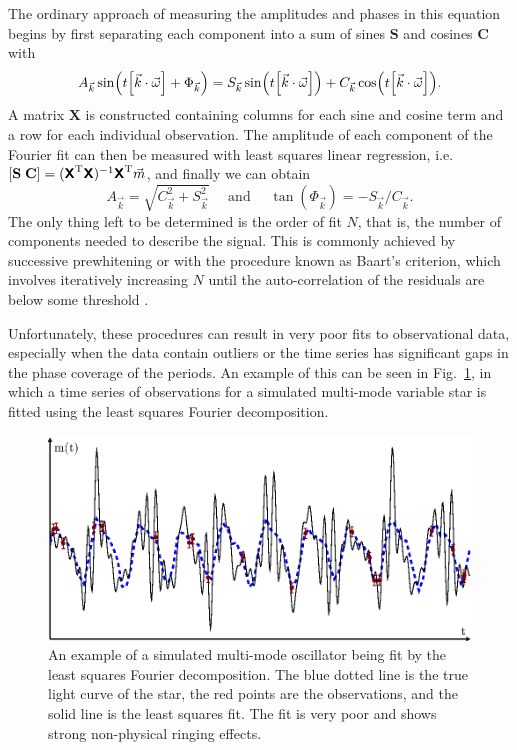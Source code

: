 \documentclass[11pt,twoside]{book}
\begin{document}
The ordinary approach of measuring the amplitudes and phases in this equation begins by first separating each component into a sum of sines $\mathbf S$ and cosines $\mathbf C$ with
\begin{equation} \label{eq:varsep}
    A_{\vec k} \sin(t\qty[\vec k\cdot \vec \omega] + \Phi_{\vec k}) = S_{\vec k} \sin(t\qty[\vec k\cdot \vec \omega]) + C_{\vec k} \cos(t\qty[\vec k\cdot \vec \omega]).
\end{equation}
A matrix $\mathbf{X}$ is constructed containing columns for each sine and cosine term and a row for each individual observation. The amplitude of each component of the Fourier fit can then be measured with least squares linear regression, i.e.~ $\qty[\mathbf{S}\; \mathbf{C}] = (\textsf{\textbf{X}}^\text{T} \textsf{\textbf{X}})^{-1} \textsf{\textbf{X}}^\text{T} \vec{m}$, and finally we can obtain
\begin{equation}
    A_{\vec{k}} = \sqrt{C_{\vec{k}}^2 + S_{\vec{k}}^2} \quad \text{ and } \quad \tan(\Phi_{\vec{k}}) = -S_{\vec{k}} / C_{\vec{k}}.
\end{equation}
The only thing left to be determined is the order of fit $N$, that is, the number of components needed to describe the signal. This is commonly achieved by successive prewhitening or with the procedure known as Baart's criterion, which involves iteratively increasing $N$ until the auto-correlation of the residuals are below some threshold \citep{baart1982use, petersen1986studies}. 

Unfortunately, these procedures can result in very poor fits to observational data, especially when the data contain outliers or the time series has significant gaps in the phase coverage of the periods. An example of this can be seen in Fig.~\ref{fig:badfit}, in which a time series of observations for a simulated multi-mode variable star is fitted using the least squares Fourier decomposition. 

\begin{figure}[!t]
    \centering
    \includegraphics[width=\textwidth]{bellinger-fig1.eps}
    \caption{An example of a simulated multi-mode oscillator being fit by the least squares Fourier decomposition. The blue dotted line is the true light curve of the star, the red points are the observations, and the solid line is the least squares fit. The fit is very poor and shows strong non-physical ringing effects.} 
    \label{fig:badfit} 
\end{figure} 
\end{document}
